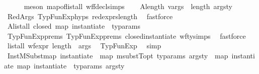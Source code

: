 \begin{isabellebody}
\ \ \ \ \isamarkupfalse%
\ {\isacharparenleft}{\kern0pt}meson\ map{\isacharunderscore}{\kern0pt}of{\isacharunderscore}{\kern0pt}list{\isacharunderscore}{\kern0pt}all\ wf{\isacharunderscore}{\kern0pt}fdecl{\isachardot}{\kern0pt}simps{\isacharparenright}{\kern0pt}\isanewline
\ \ \isamarkupfalse%
\ A{}{\isacharcolon}{\kern0pt}{\isachardoublequoteopen}length\ vargs\ {\isacharequal}{\kern0pt}\ length\ args{\isacharunderscore}{\kern0pt}ty{\isachardoublequoteclose}\isanewline
\ \ \ \ \isamarkupfalse%
\ RedArgs\ TypFunExp{\isachardot}{\kern0pt}hyps{\isacharparenleft}{\kern0pt}{}{\isacharparenright}{\kern0pt}\ red{\isacharunderscore}{\kern0pt}exprs{\isacharunderscore}{\kern0pt}length\ \isamarkupfalse%
\ fastforce\isanewline
\ \ \isamarkupfalse%
\ A{}{\isacharcolon}{\kern0pt}{\isachardoublequoteopen}list{\isacharunderscore}{\kern0pt}all\ closed\ {\isacharparenleft}{\kern0pt}map\ {\isacharparenleft}{\kern0pt}instantiate\ {\isasymOmega}{\isacharparenright}{\kern0pt}\ ty{\isacharunderscore}{\kern0pt}params{\isacharparenright}{\kern0pt}{\isachardoublequoteclose}\isanewline
\ \ \ \ \isamarkupfalse%
\ TypFunExp{\isachardot}{\kern0pt}prems{\isacharparenleft}{\kern0pt}{}{\isacharparenright}{\kern0pt}\ TypFunExp{\isachardot}{\kern0pt}prems{\isacharparenleft}{\kern0pt}{}{\isacharparenright}{\kern0pt}\ closed{\isacharunderscore}{\kern0pt}instantiate\ wf{\isacharunderscore}{\kern0pt}ty{\isachardot}{\kern0pt}simps{\isacharparenleft}{\kern0pt}{}{\isacharparenright}{\kern0pt}\ \isamarkupfalse%
\ fastforce\isanewline
\ \ \isamarkupfalse%
\ {\isachardoublequoteopen}list{\isacharunderscore}{\kern0pt}all\ {\isacharparenleft}{\kern0pt}wf{\isacharunderscore}{\kern0pt}expr\ {\isacharparenleft}{\kern0pt}length\ {\isasymOmega}{\isacharparenright}{\kern0pt}{\isacharparenright}{\kern0pt}\ args{\isachardoublequoteclose}\ \isamarkupfalse%
\ TypFunExp\ \isamarkupfalse%
\ simp\isanewline
\ \ \isamarkupfalse%
\ InstMSubst{\isacharcolon}{\kern0pt}{\isachardoublequoteopen}{\isacharparenleft}{\kern0pt}map\ {\isacharparenleft}{\kern0pt}instantiate\ {\isasymOmega}{\isacharparenright}{\kern0pt}\ {\isacharparenleft}{\kern0pt}map\ {\isacharparenleft}{\kern0pt}msubstT{\isacharunderscore}{\kern0pt}opt\ ty{\isacharunderscore}{\kern0pt}params{\isacharparenright}{\kern0pt}\ args{\isacharunderscore}{\kern0pt}ty{\isacharparenright}{\kern0pt}{\isacharparenright}{\kern0pt}\ {\isacharequal}{\kern0pt}\ map\ {\isacharparenleft}{\kern0pt}instantiate\ {\isacharparenleft}{\kern0pt}map\ {\isacharparenleft}{\kern0pt}instantiate\ {\isasymOmega}{\isacharparenright}{\kern0pt}\ ty{\isacharunderscore}{\kern0pt}params{\isacharparenright}{\kern0pt}{\isacharparenright}{\kern0pt}\ args{\isacharunderscore}{\kern0pt}ty{\isachardoublequoteclose}\isanewline

\end{isabellebody}
